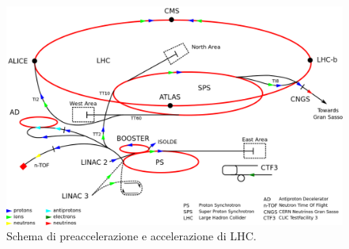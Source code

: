 \begin{figure}
\centering
\includegraphics[scale=0.25]{Immagini/LHC}
\caption{Schema di preaccelerazione e accelerazione di LHC.}
\label{fig:LHC}
\end{figure}

